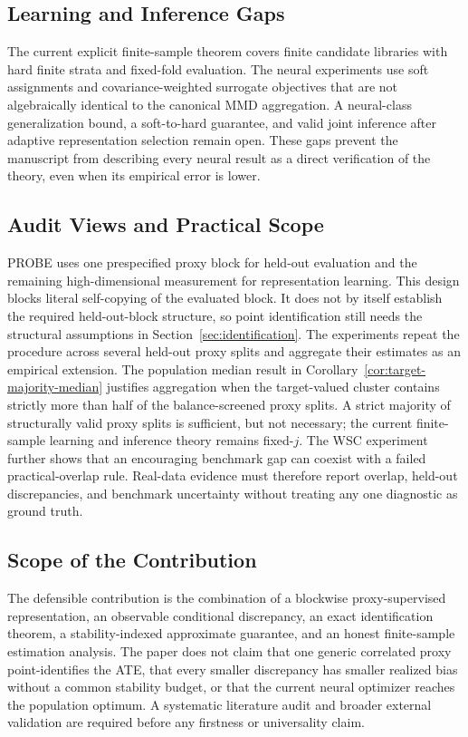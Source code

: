 \subsection{Learning and Inference Gaps}

The current explicit finite-sample theorem covers finite candidate libraries with hard finite strata and fixed-fold evaluation. The neural experiments use soft assignments and covariance-weighted surrogate objectives that are not algebraically identical to the canonical MMD aggregation. A neural-class generalization bound, a soft-to-hard guarantee, and valid joint inference after adaptive representation selection remain open. These gaps prevent the manuscript from describing every neural result as a direct verification of the theory, even when its empirical error is lower.

\subsection{Audit Views and Practical Scope}

PROBE uses one prespecified proxy block for held-out evaluation and the remaining high-dimensional measurement for representation learning. This design blocks literal self-copying of the evaluated block. It does not by itself establish the required held-out-block structure, so point identification still needs the structural assumptions in Section~\ref{sec:identification}. The experiments repeat the procedure across several held-out proxy splits and aggregate their estimates as an empirical extension. The population median result in Corollary~\ref{cor:target-majority-median} justifies aggregation when the target-valued cluster contains strictly more than half of the balance-screened proxy splits. A strict majority of structurally valid proxy splits is sufficient, but not necessary; the current finite-sample learning and inference theory remains fixed-$j$. The WSC experiment further shows that an encouraging benchmark gap can coexist with a failed practical-overlap rule. Real-data evidence must therefore report overlap, held-out discrepancies, and benchmark uncertainty without treating any one diagnostic as ground truth.

\subsection{Scope of the Contribution}

The defensible contribution is the combination of a blockwise proxy-supervised representation, an observable conditional discrepancy, an exact identification theorem, a stability-indexed approximate guarantee, and an honest finite-sample estimation analysis. The paper does not claim that one generic correlated proxy point-identifies the ATE, that every smaller discrepancy has smaller realized bias without a common stability budget, or that the current neural optimizer reaches the population optimum. A systematic literature audit and broader external validation are required before any firstness or universality claim.
